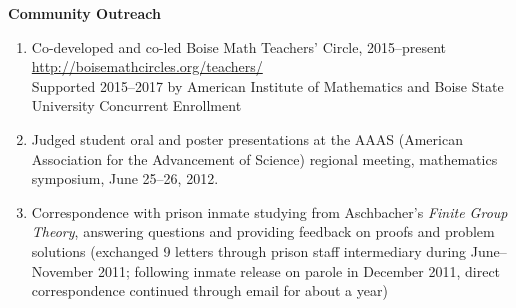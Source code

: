 \documentclass[12pt]{article}
\begin{document}
\textbf{Community Outreach}
\begin{enumerate}[revarabic]
\item Co-developed and co-led Boise Math Teachers' Circle, 2015--present \\
\url{http://boisemathcircles.org/teachers/} \\
Supported 2015--2017 by American Institute of Mathematics and Boise State University Concurrent Enrollment

\item Judged student oral and poster presentations
at the AAAS (American Association for the Advancement of Science)
regional meeting, mathematics symposium,
June 25--26, 2012.

\item Correspondence with prison inmate studying from Aschbacher's \textit{Finite Group Theory},
answering questions and providing feedback on proofs and problem solutions
(exchanged 9 letters through prison staff intermediary during June--November 2011;
following inmate release on parole in December 2011, direct correspondence continued through email for about a year)

\end{enumerate}
\end{document}
